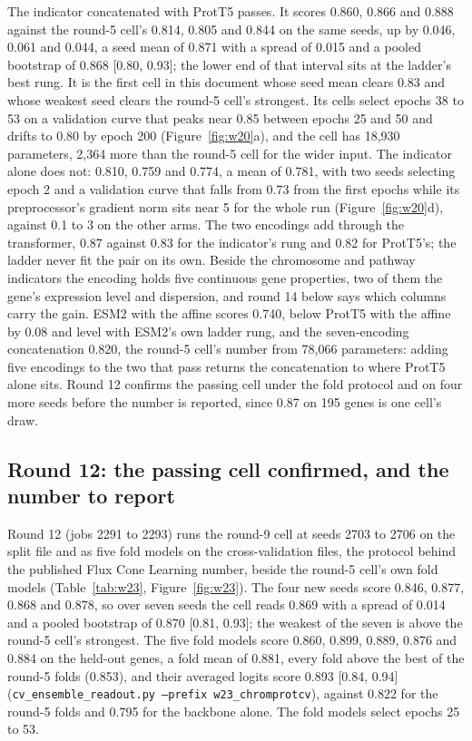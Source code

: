 The indicator concatenated with ProtT5 passes. It scores 0.860, 0.866 and 0.888 against
the round-5 cell's 0.814, 0.805 and 0.844 on the same seeds, up by 0.046, 0.061 and
0.044, a seed mean of 0.871 with a spread of 0.015 and a pooled bootstrap of 0.868
[0.80, 0.93]; the lower end of that interval sits at the ladder's best rung. It is the
first cell in this document whose seed mean clears 0.83 and whose weakest seed clears
the round-5 cell's strongest. Its cells select epochs 38 to 53 on a validation curve that
peaks near 0.85 between epochs 25 and 50 and drifts to 0.80 by epoch 200
(Figure~\ref{fig:w20}a), and the cell has 18,930 parameters, 2,364 more than the round-5
cell for the wider input. The indicator alone does not: 0.810, 0.759 and 0.774, a mean of
0.781, with two seeds selecting epoch 2 and a validation curve that falls from 0.73 from
the first epochs while its preprocessor's gradient norm sits near 5 for the whole run
(Figure~\ref{fig:w20}d), against 0.1 to 3 on the other arms. The two encodings add
through the transformer, 0.87 against 0.83 for the indicator's rung and 0.82 for
ProtT5's; the ladder never fit the pair on its own. Beside the chromosome and pathway
indicators the encoding holds five continuous gene properties, two of them the gene's
expression level and dispersion, and round 14 below says which columns carry the gain.
ESM2 with the affine scores
0.740, below ProtT5 with the affine by 0.08 and level with ESM2's own ladder rung, and
the seven-encoding concatenation 0.820, the round-5 cell's number from 78,066 parameters:
adding five encodings to the two that pass returns the concatenation to where ProtT5
alone sits. Round 12 confirms the passing cell under the fold protocol and on four more
seeds before the number is reported, since 0.87 on 195 genes is one cell's draw.

\subsection{Round 12: the passing cell confirmed, and the number to report}

Round 12 (jobs 2291 to 2293) runs the round-9 cell at seeds 2703 to 2706 on the split
file and as five fold models on the cross-validation files, the protocol behind the
published Flux Cone Learning number, beside the round-5 cell's own fold models
(Table~\ref{tab:w23}, Figure~\ref{fig:w23}). The four new seeds score 0.846, 0.877, 0.868
and 0.878, so over seven seeds the cell reads 0.869 with a spread of 0.014 and a pooled
bootstrap of 0.870 [0.81, 0.93]; the weakest of the seven is above the round-5 cell's
strongest. The five fold models score 0.860, 0.899, 0.889, 0.876 and 0.884 on the held-out
genes, a fold mean of 0.881, every fold above the best of the round-5 folds (0.853), and
their averaged logits score 0.893 [0.84, 0.94]
(\texttt{cv\_ensemble\_readout.py --prefix w23\_chromprotcv}), against 0.822 for the
round-5 folds and 0.795 for the backbone alone. The fold models select epochs 25 to 53.

